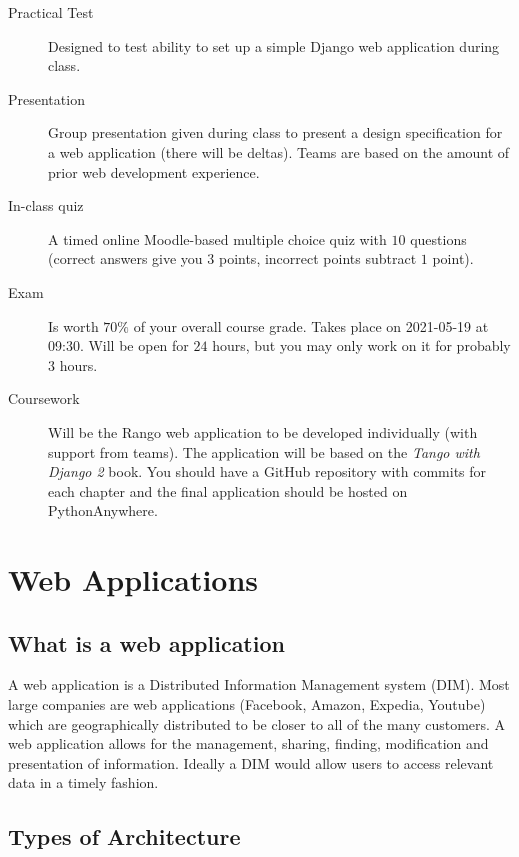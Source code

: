\begin{description}
    \item[Practical Test] Designed to test ability to set up a simple Django web application during class.
    \item[Presentation] Group presentation given during class to present a design specification for a web application (there will be deltas). Teams are based on the amount of prior web development experience.
    \item[In-class quiz] A timed online Moodle-based multiple choice quiz with \(10\) questions (correct answers give you \(3\) points, incorrect points subtract \(1\) point).
    \item[Exam] Is worth \(70\%\) of your overall course grade. Takes place on 2021-05-19 at 09:30. Will be open for \(24\) hours, but you may only work on it for probably \(3\) hours.
    \item[Coursework] Will be the Rango web application to be developed individually (with support from teams).
        The application will be based on the \emph{Tango with Django 2} book.
        You should have a GitHub repository with commits for each chapter and the final application should be hosted on PythonAnywhere.
\end{description}

\section{Web Applications}\label{sec:web_applications}

\subsection{What is a web application}\label{sub:what_is_a_web_app}

A web application is a Distributed Information Management system (DIM).
Most large companies are web applications (Facebook, Amazon, Expedia, Youtube) which are geographically distributed to be closer to all of the many customers.
A web application allows for the management, sharing, finding, modification and presentation of information.
Ideally a DIM would allow users to access relevant data in a timely fashion.

\subsection{Types of Architecture}\label{sub:types_of_architecture}

